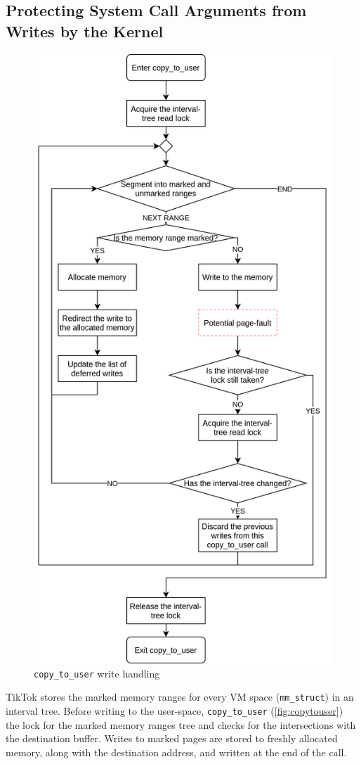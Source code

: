 \documentclass[conference]{IEEEtran}
\newcommand{\sysname}{TikTok}
\begin{document}
\subsection{Protecting System Call Arguments from Writes by the Kernel}
\label{subsec:kernelland}
\begin{figure}[]
  \centering
  \includegraphics[width = 0.8\linewidth]{img/copy_to_user.png}
  \caption{\texttt{copy\_to\_user} write handling}
  \label{fig:copytouser}
\end{figure}

\sysname{} stores the marked memory ranges for every VM space
(\texttt{mm\_struct}) in an interval tree. Before writing to the user-space,
\texttt{copy\_to\_user} (\autoref{fig:copytouser}) the lock for the marked
memory ranges tree and checks for the intersections with the destination buffer.
Writes to marked pages are stored to freshly allocated memory, along with the
destination address, and written at the end of the call.
\end{document}

